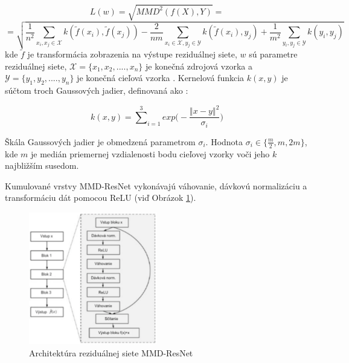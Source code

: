 \begin{equation}
    L(w) = \sqrt{MMD^2(f(X), Y)} = 
\end{equation}
\[
= \sqrt{\frac{1}{n^2}\sum_{x_i, x_j \in \mathcal{X}}^{}{k(\tilde{f}(x_i),\tilde{f}(x_j))} - 
\frac{2}{nm}\sum_{x_i \in \mathcal{X}, y_j \in \mathcal{Y}}^{}{k(\tilde{f}(x_i),y_j)} +
\frac{1}{m^2}\sum_{y_i, y_j \in \mathcal{Y}}^{}{k(y_i,y_j)}
}
\]
kde $\tilde{f}$ je transformácia zobrazenia na výstupe reziduálnej siete, $w$ sú parametre reziduálnej siete, $\mathcal{X} = \{x_1, x_2, .... , x_n\}$ je konečná zdrojová vzorka a $\mathcal{Y} = \{y_1, y_2, .... , y_n\}$ je konečná cieľová vzorka \cite{Li2017}. Kernelová funkcia $k(x, y)$ je súčtom troch Gaussových jadier, definovaná ako \cite{Li2017}:

\begin{equation}
\label{kernel_funct}
k(x,y) = {\sum^3}_{i=1}exp\bigg(-\frac{{\left\Vert x-y \right\Vert}^2}{\sigma_i}\bigg)
\end{equation}

Škála Gaussových jadier je obmedzená parametrom $\sigma_i$. Hodnota $\sigma_i \in \{\frac{m}{2}, m, 2m\}$, kde $m$ je medián priemernej vzdialenosti bodu cieľovej vzorky voči jeho $k$ najbližším susedom.

Kumulované vrstvy MMD-ResNet vykonávajú váhovanie, dávkovú normalizáciu a transformáciu dát pomocou ReLU (viď Obrázok \ref{MMD-ResNet_arch}). 

\begin{figure}
\centerline{\includegraphics[width=0.5\textwidth]{images/MMD-ResNet_arch.png}}
\caption[Architektúra MMD-ResNet]{Architektúra reziduálnej siete MMD-ResNet}
\label{MMD-ResNet_arch}
\end{figure}



